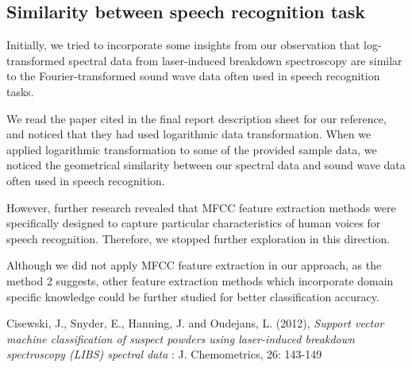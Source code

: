 \documentclass[12pt,onecolumn,letterpaper]{article}
\begin{document}
\subsection{Similarity between speech recognition task}

Initially, we tried to incorporate some insights from our observation that log-transformed spectral data from laser-induced breakdown spectroscopy are similar to the Fourier-transformed sound wave data often used in speech recognition tasks.

We read the paper \cite{cisewski} cited in the final report description sheet for our reference, and noticed that they had used logarithmic data transformation. When we applied logarithmic transformation to some of the provided sample data, we noticed the geometrical similarity between our spectral data and sound wave data often used in speech recognition.  

However, further research revealed that MFCC feature extraction methods were specifically designed to capture particular characteristics of human voices for speech recognition. Therefore, we stopped further exploration in this direction.

Although we did not apply MFCC feature extraction in our approach, as the method 2 suggests, other feature extraction methods which incorporate domain specific knowledge could be further studied for better classification accuracy. 


{\small


}

\begin{thebibliography}{1}

   Cisewski, J., Snyder, E., Hanning, J. and Oudejans, L. (2012), {\em Support vector machine classification of suspect powders using laser-induced breakdown spectroscopy (LIBS) spectral data} : J. Chemometrics, 26: 143-149


\end{thebibliography}




{\small


}
\end{document}
